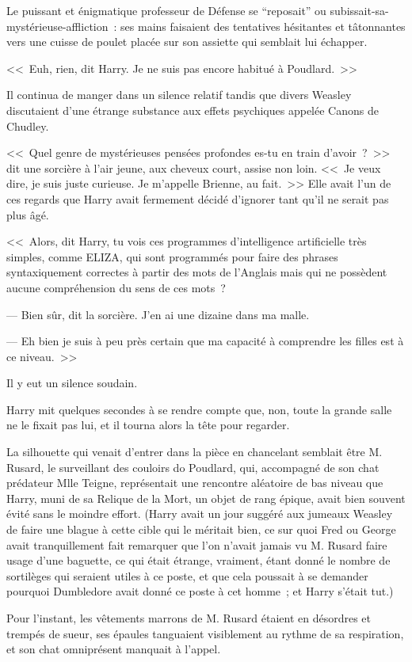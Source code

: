 Le puissant et énigmatique professeur de Défense se “reposait” ou subissait-sa-mystérieuse-affliction~: ses mains faisaient des tentatives hésitantes et tâtonnantes vers une cuisse de poulet placée sur son assiette qui semblait lui échapper.

<<~Euh, rien, dit Harry. Je ne suis pas encore habitué à Poudlard.~>>

Il continua de manger dans un silence relatif tandis que divers Weasley discutaient d'une étrange substance aux effets psychiques appelée Canons de Chudley.

<<~Quel genre de mystérieuses pensées profondes es-tu en train d'avoir~?~>> dit une sorcière à l'air jeune, aux cheveux court, assise non loin. <<~Je veux dire, je suis juste curieuse. Je m'appelle Brienne, au fait.~>> Elle avait l'un de ces regards que Harry avait fermement décidé d'ignorer tant qu'il ne serait pas plus âgé.

<<~Alors, dit Harry, tu vois ces programmes d'intelligence artificielle très simples, comme ELIZA, qui sont programmés pour faire des phrases syntaxiquement correctes à partir des mots de l'Anglais mais qui ne possèdent aucune compréhension du sens de ces mots~?

--- Bien sûr, dit la sorcière. J'en ai une dizaine dans ma malle.

--- Eh bien je suis à peu près certain que ma capacité à comprendre les filles est à ce niveau.~>>

Il y eut un silence soudain.

Harry mit quelques secondes à se rendre compte que, non, toute la grande salle ne le fixait pas lui, et il tourna alors la tête pour regarder.

La silhouette qui venait d'entrer dans la pièce en chancelant semblait être M. Rusard, le surveillant des couloirs do Poudlard, qui, accompagné de son chat prédateur Mlle Teigne, représentait une rencontre aléatoire de bas niveau que Harry, muni de sa Relique de la Mort, un objet de rang épique, avait bien souvent évité sans le moindre effort. (Harry avait un jour suggéré aux jumeaux Weasley de faire une blague à cette cible qui le méritait bien, ce sur quoi Fred ou George avait tranquillement fait remarquer que l'on n'avait jamais vu M. Rusard faire usage d'une baguette, ce qui était étrange, vraiment, étant donné le nombre de sortilèges qui seraient utiles à ce poste, et que cela poussait à se demander pourquoi Dumbledore avait donné ce poste à cet homme~; et Harry s'était tut.)

Pour l'instant, les vêtements marrons de M. Rusard étaient en désordres et trempés de sueur, ses épaules tanguaient visiblement au rythme de sa respiration, et son chat omniprésent manquait à l'appel.


